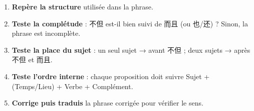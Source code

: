 \documentclass[11pt]{article}
\begin{document}
\begin{methode}
\begin{enumerate}
\item \textbf{Repère la structure} utilisée dans la phrase.
\item \textbf{Teste la complétude} : 不但 est-il bien suivi de 而且 (ou 也/还) ? Sinon, la phrase est incomplète.
\item \textbf{Teste la place du sujet} : un seul sujet → avant 不但 ; deux sujets → après 不但 et 而且.
\item \textbf{Teste l'ordre interne} : chaque proposition doit suivre Sujet + (Temps/Lieu) + Verbe + Complément.
\item \textbf{Corrige puis traduis} la phrase corrigée pour vérifier le sens.
\end{enumerate}
\end{methode}
\end{document}
